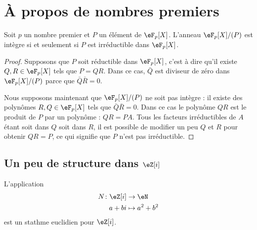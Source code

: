 \section{À propos de nombres premiers}

\begin{proposition} \label{PropleGdaT}
    Soit \( p\) un nombre premier et \( P\) un élément de \( \eF_p[X]\). L'anneau \( \eF_p[X]/(P)\) est intègre si et seulement si \( P\) est irréductible dans \( \eF_p[X]\).
\end{proposition}

\begin{proof}
    Supposons que \( P\) soit réductible dans \( \eF_p[X]\), c'est à dire qu'il existe \( Q,R\in \eF_p[X]\) tels que \( P=QR\). Dans ce cas, \( \bar Q\) est diviseur de zéro dans \( \eF_p[X]/(P)\) parce que \( \bar Q\bar R=0\).

    Nous supposons maintenant que \( \eF_p[X]/(P)\) ne soit pas intègre : il existe des polynômes \( R,Q\in \eF_p[X]\) tels que \( \bar Q\bar R=0\). Dans ce cas le polynôme \( QR\) est le produit de \( P\) par un polynôme : \( QR=PA\). Tous les facteurs irréductibles de \( A \) étant soit dans \( Q\) soit dans \( R\), il est possible de modifier un peu \( Q\) et \( R\) pour obtenir \( QR=P\), ce qui signifie que \( P\) n'est pas irréductible.
\end{proof}

\subsection{Un peu de structure dans \texorpdfstring{$ \eZ[i]$}{Zi}}

\begin{lemma}   \label{LemSCAlICY}
     L'application
     \begin{equation}
         \begin{aligned}
             N\colon \eZ[i]&\to \eN \\
             a+bi&\mapsto a^2+b^2 
         \end{aligned}
     \end{equation}
     est un stathme euclidien pour \( \eZ[i]\).
\end{lemma}

